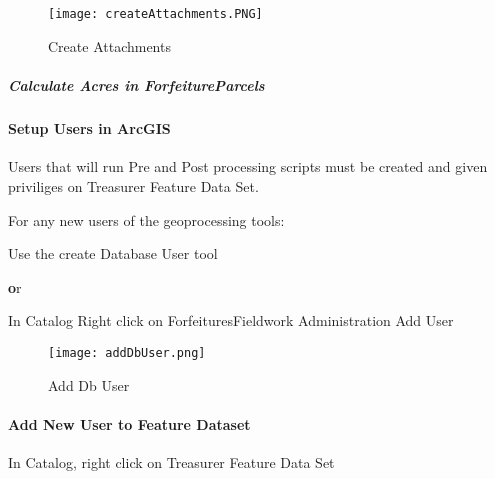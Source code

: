  \subparagraph*{}
 \begin{figure}[h!]
 \centering
     \texttt{[image: createAttachments.PNG]}
 \caption{Create Attachments}
 \end{figure}
 
 
  \subparagraph{Calculate Acres in ForfeitureParcels}


 \clearpage
 
 
 \paragraph[Setup Users in ArcGIS]{\Large Setup Users in ArcGIS\texorpdfstring{\\}{}}

 Users that will run Pre and Post processing scripts must be created and given priviliges on Treasurer Feature Data Set.
 \vspace{.35in}

 \noindent For any new users of the geoprocessing tools:

 \vspace{.15in}

 Use the create Database User tool
  \vspace{.15in}

 {\textbf or}

 \vspace{.15in}

In Catalog {\rtArrow} Right click on ForfeituresFieldwork {\rtArrow} Administration {\rtArrow} Add User

 \vspace{.35in}

 \begin{figure}[h!]
 \centering
     \texttt{[image: addDbUser.png]}
 \caption{Add Db User}
 \end{figure}
 \clearpage
 \paragraph[Add New User to Feature Dataset]{\Large Add New User to Feature Dataset\texorpdfstring{\\}{}}
 \vspace{.35in}

 In Catalog, { \rtArrow} right click on Treasurer Feature Data Set
 \vspace{.15in}

